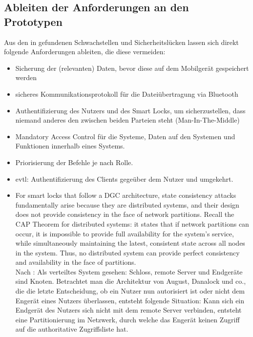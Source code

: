 \subsection{Ableiten der Anforderungen an den Prototypen}
\label{sec:analysis_requirements}
    Aus den in  gefundenen Schwachstellen und Sicherheitslücken lassen sich direkt folgende Anforderungen ableiten, die diese vermeiden:
    \begin{itemize}
        \item Sicherung der (relevanten) Daten, bevor diese auf dem Mobilgerät gespeichert werden\cite{Ye2017}
        \item sicheres Kommunikationsprotokoll für die Dateiübertragung via Bluetooth\cite{Ye2017}
        \item Authentifizierung des Nutzers und des Smart Locks, um sicherzustellen, dass niemand anderes den zwischen beiden Parteien steht (Man-In-The-Middle)\cite{Ye2017}
        \item Mandatory Access Control für die Systeme, Daten auf den Systemen und Funktionen innerhalb eines Systems.\cite{Ye2017}
        \item Priorisierung der Befehle\cite{Ye2017} je nach Rolle.
        \item evtl: Authentifizierung des Clients gegeüber dem Nutzer und umgekehrt.\cite{Ye2017}
        \item For smart locks that follow a DGC architecture, state consistency attacks fundamentally arise because they are distributed systems, and their design does not provide consistency in the face of network partitions. Recall the CAP Theorem for distributed systems: it states that if network partitions can occur, it is impossible to provide full availability for the system's service, while simultaneously maintaining the latest, consistent state across all nodes in the system.
        Thus, no distributed system can provide perfect consistency and availability in the face of partitions.\cite{Ho2016} \\
        Nach \citeauthor{Ho2016}:
        Als verteiltes System gesehen: Schloss, remote Server und Endgeräte sind Knoten.
        Betrachtet man die Architektur von August, Danalock und co., die die letzte Entscheidung, ob ein Nutzer nun autorisiert ist oder nicht dem Engerät eines Nutzers überlassen, entsteht folgende Situation:
        Kann sich ein Endgerät des Nutzers sich nicht mit dem remote Server verbinden, entsteht eine Partitionierung im Netzwerk, durch welche das Engerät keinen Zugriff auf die authoritative Zugriffsliste hat.

\end{itemize}
